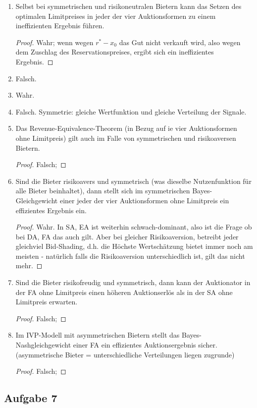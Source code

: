 \documentclass[12pt]{extreport} %
\theoremstyle{named}
\theoremstyle{itshape}
\theoremstyle{normal}
\begin{document}
\begin{enumerate}
\begin{proof}
		\end{proof}
	\item Selbst bei symmetrischen und risikoneutralen Bietern kann das Setzen des optimalen Limitpreises in jeder der vier Auktionsformen zu einem ineffizienten Ergebnis führen.
		\begin{proof}
			Wahr; wenn wegen $r^{*} - x_{0}$ das Gut nicht verkauft wird, also wegen dem Zuschlag des Reservationspreises, ergibt sich ein ineffizientes Ergebnis.
		\end{proof}
	\item Falsch.
	\item Wahr.
	\item Falsch. Symmetrie: gleiche Wertfunktion und gleiche Verteilung der Signale.
	\item Das Revenue-Equivalence-Theorem (in Bezug auf ie vier Auktionsformen ohne Limitpreis) gilt auch im Falle von symmetrischen und risikoaversen Bietern.
		\begin{proof}
			Falsch;
		\end{proof}
	\item Sind die Bieter risikoavers und symmetrisch (was dieselbe Nutzenfunktion für alle Bieter beinhaltet), dann stellt sich im symmetrischen Bayes-Gleichgewicht einer jeder der vier Auktionsformen ohne Limitpreis ein effizientes Ergebnis ein.
		\begin{proof}
			 Wahr. In SA, EA ist weiterhin schwach-dominant, also ist die Frage ob bei DA, FA das auch gilt. Aber bei gleicher Risikoaversion, betreibt jeder gleichviel Bid-Shading, d.h. die Höchste Wertschätzung bietet immer noch am meisten - natürlich falls die Risikoaversion unterschiedlich ist, gilt das nicht mehr.
		\end{proof}
	\item Sind die Bieter risikofreudig und symmetrisch, dann kann der Auktionator in der FA ohne Limitpreis einen höheren Auktionserlös als in der SA ohne Limitpreis erwarten.
		\begin{proof}
			Falsch; 
		\end{proof}
	\item Im IVP-Modell mit asymmetrischen Bietern stellt das Bayes-Nashgleichgewicht einer FA ein effizientes Auktionsergebnis sicher. (asymmetrische Bieter = unterschiedliche Verteilungen liegen zugrunde)
		\begin{proof}
			Falsch;
		\end{proof}
\end{enumerate}

\subsection*{Aufgabe 7}
\end{document}
